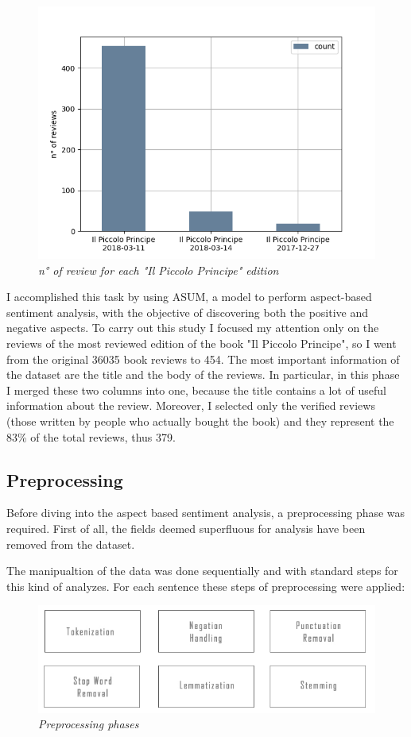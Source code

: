 \documentclass[a4paper,12pt]{article}
\begin{document}
\begin{figure}[H]
	\centering
	\includegraphics[width=0.6\linewidth]{img/piccolo_prin_editions.png}
	\caption{\textit{n° of review for each "Il Piccolo Principe" edition}}
\end{figure}


\noindent I accomplished this task by using ASUM, a model to perform aspect-based sentiment analysis, with the objective of discovering both the positive and negative aspects. To carry out this study I focused my attention only on the reviews of the most reviewed edition of the book "Il Piccolo Principe", so I went from the original 36035 book reviews to 454. 
The most important information of the dataset are the title and the body of the reviews. In particular, in this phase I merged these two columns into one, because the title contains a lot of useful information about the review. Moreover, I selected only the verified reviews (those written by people who actually bought the book) and they represent the 83\% of the total reviews, thus 379.

\subsection{Preprocessing}
Before diving into the aspect based sentiment analysis, a preprocessing phase was required. First of all, the fields deemed superfluous for analysis have been removed from the dataset.

\noindent The manipualtion of the data was done sequentially and with standard steps for this kind of analyzes. For each sentence these steps of preprocessing were applied:

\begin{figure}[H]
	\centering
	\includegraphics[width=1\linewidth]{img/preproc.jpg}
	\caption{\textit{Preprocessing phases}}
\end{figure}
\end{document}
